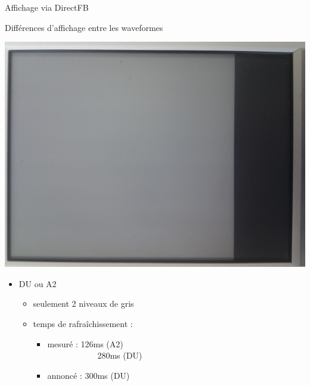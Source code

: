 \begin{frame}{ Affichage via DirectFB }
	\begin{block} { Différences d'affichage entre les waveformes }
		\parbox{0.3\linewidth}{
			\includegraphics[angle=-90,origin=c,scale=0.04]{du_a2.jpg}
		}
		\parbox{0.6\linewidth}{
			\begin{itemize}
				\item DU ou A2
				\begin{itemize}
					\item seulement 2 niveaux de gris
					\item temps de rafraîchissement : 
					\begin{itemize}
						\item mesuré  : 126ms (A2) \\ 
					                    ~~~~~~~~~~~~280ms (DU)
						\item annoncé  : 300ms (DU)
					\end{itemize}		
				\end{itemize}
			\end{itemize}
		}
	\end{block}
\end{frame}